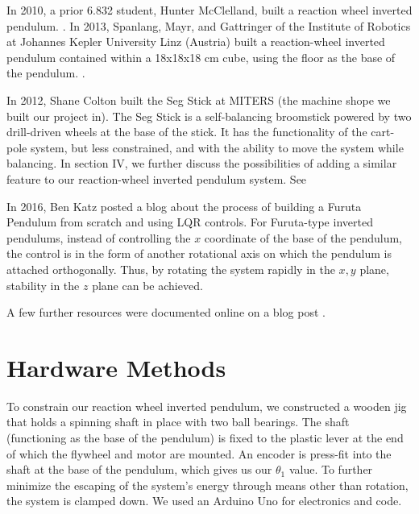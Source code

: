 \documentclass[conference]{IEEEtran}
\begin{document}
In 2010, a prior 6.832 student, Hunter McClelland, built a reaction wheel
inverted pendulum. \cite{prior}.  In 2013, Spanlang, Mayr, and Gattringer of the Institute of Robotics at Johannes
Kepler University Linz (Austria) built a reaction-wheel inverted pendulum
contained within a 18x18x18 cm cube, using the floor as the base of the
pendulum. \cite{mayr2015mechatronic}.

In 2012, Shane Colton built the Seg Stick at
MITERS (the machine shope we built our project in). The Seg Stick is a
self-balancing broomstick powered by two drill-driven wheels at the base of the
stick. It has the functionality of the cart-pole system, but less constrained,
and with the ability to move the system while balancing. In section IV, we
further discuss the possibilities of adding a similar feature to our
reaction-wheel inverted pendulum system. See \cite{scolton}


In 2016, Ben Katz posted a blog about the process of building a Furuta Pendulum
from scratch and using LQR controls. For Furuta-type inverted pendulums, instead of
controlling the $x$ coordinate of the base of the pendulum, the control is in
the form of another rotational axis on which the pendulum is attached
orthogonally. Thus, by rotating the system rapidly in the $x, y$ plane,
stability in the $z$ plane can be achieved.  \cite{katz}

A few further resources were documented online on a blog post \cite{projects}.


\section{Hardware Methods} 

To constrain our reaction wheel inverted pendulum, we
constructed a wooden jig that holds a spinning shaft in place with two ball
bearings. The shaft (functioning as the base of the pendulum) is fixed to the
plastic lever at the end of which the flywheel and motor are mounted. An encoder
is press-fit into the shaft at the base of the pendulum, which gives us our
$\theta_1$ value. To further minimize the escaping of the system's energy
through means other than rotation, the system is clamped down. We used an
Arduino Uno for electronics and code.
\end{document}
